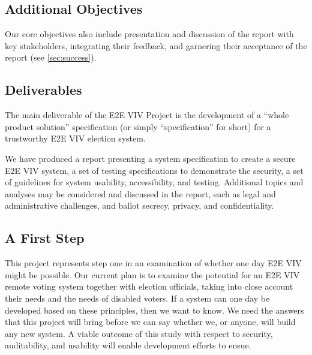 \subsection{Additional Objectives}
\label{sec:addit-object}

Our core objectives also include presentation and discussion of the
report with key stakeholders, integrating their feedback, and
garnering their acceptance of the report (see \autoref{sec:success}).

\subsection{Deliverables}
\label{sec:deliverables}

The main deliverable of the E2E VIV Project is the development of a
``whole product solution'' specification (or simply ``specification''
for short) for a trustworthy E2E VIV election system.

We have produced a report presenting a system specification to create
a secure E2E VIV system, a set of testing specifications to
demonstrate the security, a set of guidelines for system usability,
accessibility, and testing. Additional topics and analyses may be
considered and discussed in the report, such as legal and
administrative challenges, and ballot secrecy, privacy, and
confidentiality.

\subsection{A First Step}
\label{sec:first-step}

This project represents step one in an examination of whether one day
E2E VIV might be possible. Our current plan is to examine the
potential for an E2E VIV remote voting system together with election
officials, taking into close account their needs and the needs of
disabled voters. If a system can one day be developed based on these
principles, then we want to know. We need the answers that this
project will bring before we can say whether we, or anyone, will build
any new system. A viable outcome of this study with respect to
security, auditability, and usability will enable development efforts
to ensue.

